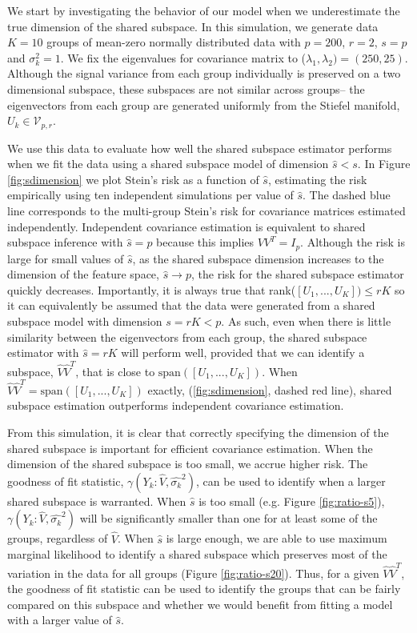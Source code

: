 \documentclass[12pt]{article}
\begin{document}
We start by investigating the behavior of our model when we
underestimate the true dimension of the shared subspace.  In this
simulation, we generate data $K=10$ groups of mean-zero normally
distributed data with $p=200$, $r=2$, $s=p$ and $\sigma_k^2=1$.  We
fix the eigenvalues for covariance matrix to
($\lambda_1, \lambda_2) = (250, 25)$.  Although the signal variance
from each group individually is preserved on a two dimensional
subspace, these subspaces are not similar across groups-- the
eigenvectors from each group are generated uniformly from the Stiefel
manifold, $U_k \in \mathcal{V}_{p, r}$.

We use this data to evaluate how well the shared subspace estimator
performs when we fit the data using a shared subspace model of
dimension $\hat{s} < s$.  In Figure \ref{fig:sdimension} we plot
Stein's risk as a function of $\hat{s}$, estimating the risk
empirically using ten independent simulations per value of $\hat{s}$.
The dashed blue line corresponds to the multi-group Stein's risk for
covariance matrices estimated independently.  Independent covariance
estimation is equivalent to shared subspace inference with
$\hat{s} = p$ because this implies $VV^T = I_p$.  Although the risk is
large for small values of $\hat{s}$, as the shared subspace dimension
increases to the dimension of the feature space,
$\hat{s} \rightarrow p$, the risk for the shared subspace estimator
quickly decreases.  Importantly, it is always true that
rank($[U_1, ..., U_K]) \leq rK$ so it can equivalently be assumed that
the data were generated from a shared subspace model with dimension
$s = rK < p$.  As such, even when there is little similarity between the
eigenvectors from each group, the shared subspace estimator with
$\hat{s} = rK$ will perform well, provided that we can identify a
subspace, $\hat{V}\hat{V}^T$, that is close to
$\text{span}([U_1, ..., U_K])$. When
$\hat{V}\hat{V}^T = \text{span}([U_1, ..., U_K])$ exactly,
(\ref{fig:sdimension}, dashed red line),
shared subspace estimation outperforms independent covariance
estimation.

From this simulation, it is clear that correctly specifying the
dimension of the shared subspace is important for efficient covariance
estimation.  When the dimension of the shared subspace is too small,
we accrue higher risk.  The goodness of fit statistic,
$\gamma(Y_k: \hat{V}, \hat{\sigma_k}^2)$, can be used to identify when
a larger shared subspace is warranted.  When $\hat{s}$ is too small
(e.g. Figure \ref{fig:ratio-s5}),
$\gamma(Y_k: \hat{V}, \hat{\sigma_k}^2)$ will be significantly smaller
than one for at least some of the groups, regardless of $\hat{V}$.
When $\hat{s}$ is large enough, we are able to use maximum marginal
likelihood to identify a shared subspace which preserves most of the
variation in the data for all groups (Figure \ref{fig:ratio-s20}).
Thus, for a given $\hat{V}\hat{V}^T$, the goodness of fit statistic
can be used to identify the groups that can be fairly compared on this
subspace and whether we would benefit from fitting a model with a
larger value of $\hat{s}$.
\end{document}
